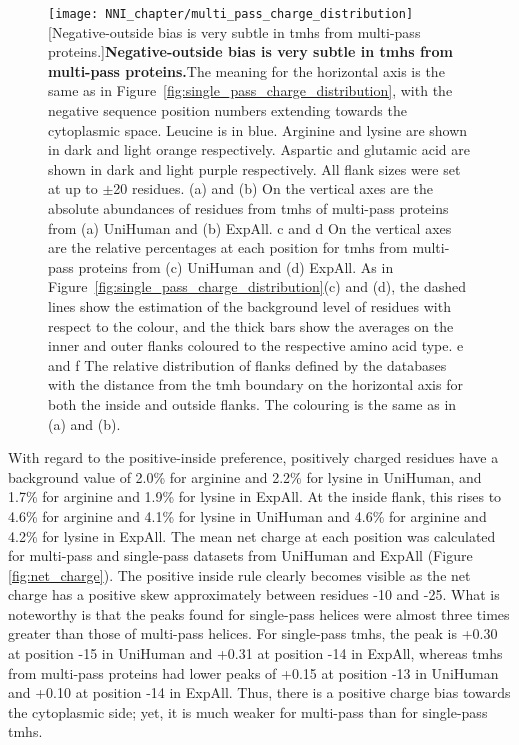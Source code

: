 \begin{figure}[!p]
\centering
\texttt{[image: NNI\_chapter/multi\_pass\_charge\_distribution]}
[Negative-outside bias is very subtle in \gls{tmh}s from multi-pass proteins.]{\textbf{Negative-outside bias is very subtle in \gls{tmh}s from multi-pass proteins.}The meaning for the horizontal axis is the same as in Figure~\ref{fig:single_pass_charge_distribution}, with the negative sequence position numbers extending towards the cytoplasmic space.
Leucine is in blue.
Arginine and lysine are shown in dark and light orange respectively.
Aspartic and glutamic acid are shown in dark and light purple respectively.
All flank sizes were set at up to $\pm$20 residues.
(a) and (b) On the vertical axes are the absolute abundances of residues from \gls{tmh}s of multi-pass proteins from (a) UniHuman and (b) ExpAll.
c and d On the vertical axes are the relative percentages at each position for \gls{tmh}s from multi-pass proteins from (c) UniHuman and (d) ExpAll.
As in Figure~\ref{fig:single_pass_charge_distribution}(c) and (d), the dashed lines show the estimation of the background level of residues with respect to the colour, and the thick bars show the averages on the inner and outer flanks coloured to the respective amino acid type.
e and f The relative distribution of flanks defined by the databases with the distance from the \gls{tmh} boundary on the horizontal axis for both the inside and outside flanks.
The colouring is the same as in (a) and (b).}

\label{fig:multi_pass_charge_distribution}
\end{figure}

With regard to the positive-inside preference, positively charged residues have a background value of 2.0\% for arginine and 2.2\% for lysine in UniHuman, and 1.7\% for arginine and 1.9\% for lysine in ExpAll.
At the inside flank, this rises to 4.6\% for arginine and 4.1\% for lysine in UniHuman and 4.6\% for arginine and 4.2\% for lysine in ExpAll.
The mean net charge at each position was calculated for multi-pass and single-pass datasets from UniHuman and ExpAll (Figure \ref{fig:net_charge}).
The positive inside rule clearly becomes visible as the net charge has a positive skew approximately between residues -10 and -25.
What is noteworthy is that the peaks found for single-pass helices were almost three times greater than those of multi-pass helices.
For single-pass \gls{tmh}s, the peak is +0.30 at position -15 in UniHuman and +0.31 at position -14 in ExpAll, whereas \gls{tmh}s from multi-pass proteins had lower peaks of +0.15 at position -13 in UniHuman and +0.10 at position -14 in ExpAll.
Thus, there is a positive charge bias towards the cytoplasmic side; yet, it is much weaker for multi-pass than for single-pass \gls{tmh}s.

